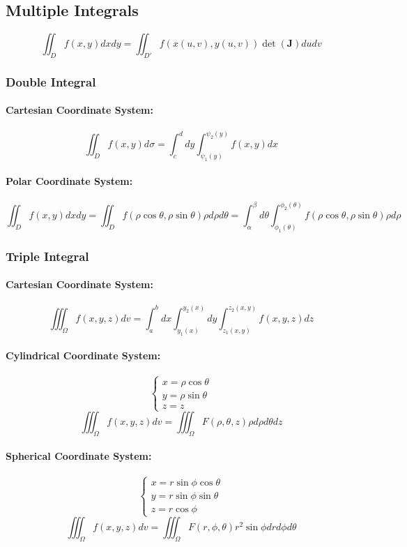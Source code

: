 \documentclass{article}
\begin{document}
\subsection{Multiple Integrals}

\[
    \iint_D f(x, y) dx dy = \iint_{D'} f(x(u, v), y(u, v)) \det(\mathbf{J}) du dv
\]

\subsubsection{Double Integral}

\paragraph{Cartesian Coordinate System:}
\[
    \iint_D f(x, y) d\sigma = \int_c^d dy \int_{\psi_1(y)}^{\psi_2(y)} f(x, y) dx
\]
\paragraph{Polar Coordinate System:}
\[
    \iint_D f(x, y) dx dy = \iint_D f(\rho \cos \theta, \rho \sin \theta) \rho d\rho d\theta = \int_\alpha^\beta d\theta \int_{\phi_1(\theta)}^{\phi_2(\theta)} f(\rho \cos \theta, \rho \sin \theta) \rho d\rho
\]

\subsubsection{Triple Integral}

\paragraph{Cartesian Coordinate System:}
\[
    \iiint_\Omega f(x, y, z) dv = \int_a^b dx \int_{y_1(x)}^{y_2(x)} dy \int_{z_1(x, y)}^{z_2(x, y)} f(x, y, z) dz
\]
\paragraph{Cylindrical Coordinate System:}
\[
    \begin{cases}
        x = \rho \cos \theta \\
        y = \rho \sin \theta \\
        z = z
    \end{cases}
\]
\[
    \iiint_\Omega f(x, y, z) dv = \iiint_\Omega F(\rho, \theta, z) \rho d\rho d\theta dz
\]
\paragraph{Spherical Coordinate System:}
\[
    \begin{cases}
        x = r \sin \phi \cos \theta \\
        y = r \sin \phi \sin \theta \\
        z = r \cos \phi
    \end{cases}
\]
\[
    \iiint_\Omega f(x, y, z) dv = \iiint_\Omega F(r, \phi, \theta) r^2 \sin \phi dr d\phi d\theta
\]
\end{document}
